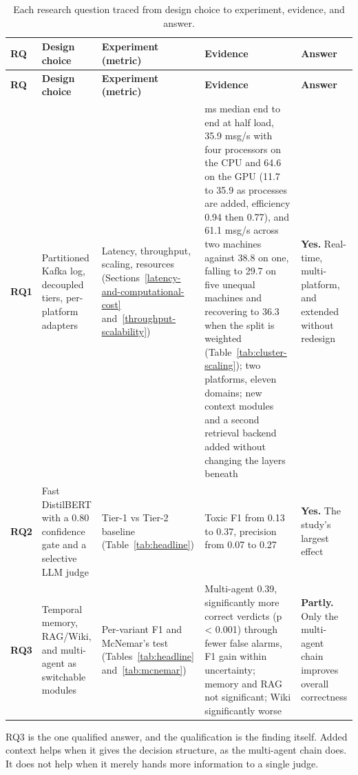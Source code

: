 \begin{longtable}{@{}
  >{\raggedright\arraybackslash}p{}
  >{\raggedright\arraybackslash}p{}
  >{\raggedright\arraybackslash}p{}
  >{\raggedright\arraybackslash}p{}
  >{\raggedright\arraybackslash}p{}@{}}
\caption{Each research question traced from design choice to experiment, evidence, and answer.}\label{tab:rq}\tabularnewline
\toprule
\textbf{RQ} & \textbf{Design choice} & \textbf{Experiment (metric)} & \textbf{Evidence} & \textbf{Answer} \\
\midrule
\endfirsthead
\toprule
\textbf{RQ} & \textbf{Design choice} & \textbf{Experiment (metric)} & \textbf{Evidence} & \textbf{Answer} \\
\midrule
\endhead
\bottomrule
\endlastfoot

\textbf{RQ1} & Partitioned Kafka log, decoupled tiers, per-platform adapters & Latency, throughput, scaling, resources (Sections~\ref{latency-and-computational-cost} and~\ref{throughput-scalability}) & 89 ms median end to end at half load, 35.9 msg/s with four processors on the CPU and 64.6 on the GPU (11.7 to 35.9 as processes are added, efficiency 0.94 then 0.77), and 61.1 msg/s across two machines against 38.8 on one, falling to 29.7 on five unequal machines and recovering to 36.3 when the split is weighted (Table~\ref{tab:cluster-scaling}); two platforms, eleven domains; new context modules and a second retrieval backend added without changing the layers beneath & \textbf{Yes.} Real-time, multi-platform, and extended without redesign \\
\addlinespace[1em]

\textbf{RQ2} & Fast DistilBERT with a 0.80 confidence gate and a selective LLM judge & Tier-1 vs Tier-2 baseline (Table~\ref{tab:headline}) & Toxic F1 from 0.13 to 0.37, precision from 0.07 to 0.27 & \textbf{Yes.} The study's largest effect \\
\addlinespace[1em]

\textbf{RQ3} & Temporal memory, RAG/Wiki, and multi-agent as switchable modules & Per-variant F1 and McNemar's test (Tables~\ref{tab:headline} and~\ref{tab:mcnemar}) & Multi-agent 0.39, significantly more correct verdicts (p \textless{} 0.001) through fewer false alarms, F1 gain within uncertainty; memory and RAG not significant; Wiki significantly worse & \textbf{Partly.} Only the multi-agent chain improves overall correctness \\

\end{longtable}
\renewcommand{\arraystretch}{1.0}

RQ3 is the one qualified answer, and the qualification is the finding itself. Added context helps when it gives the decision structure, as the multi-agent chain does. It does not help when it merely hands more information to a single judge.
